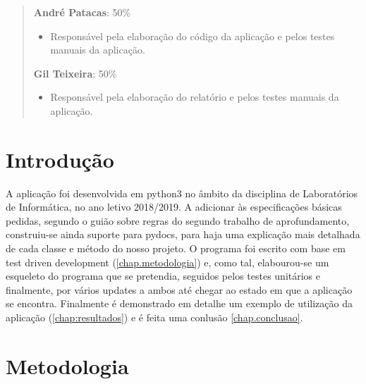 \documentclass{report}
\begin{document}
\renewcommand{\abstractname}{Contribuições dos autores}
\begin{abstract}
\textbf{André Patacas}: 50\%
\begin{itemize}
\item Responsável pela elaboração do código da aplicação e pelos testes manuais da aplicação.
\end{itemize}
\textbf{Gil Teixeira}: 50\%
\begin{itemize}
\item Responsável pela elaboração do relatório e pelos testes manuais da aplicação.
\end{itemize}
\end{abstract}

\chapter{Introdução}
\label{chap.introducao}

A aplicação foi desenvolvida em python3 no âmbito da disciplina de Laboratórios de Informática, no ano letivo 2018/2019. A adicionar às especificações básicas pedidas, segundo o guião sobre regras do segundo trabalho de aprofundamento, construiu-se ainda suporte para pydocs, para haja uma explicação mais detalhada de cada classe e método do nosso projeto. O programa foi escrito com base em test driven development  (\autoref{chap.metodologia}) e, como tal, elabourou-se um esqueleto do programa que se pretendia, seguidos pelos testes unitários e finalmente, por vários updates a ambos até chegar ao estado em que a aplicação se encontra. Finalmente é demonstrado em detalhe um exemplo de utilização da aplicação (\autoref{chap:resultados}) e é feita uma conlusão \autoref{chap.conclusao}.


\chapter{Metodologia}
\label{chap.metodologia}
\end{document}
